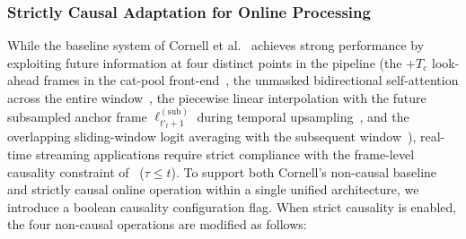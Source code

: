 \documentclass[lettersize,journal]{IEEEtran}
\begin{document}
\subsubsection{Strictly Causal Adaptation for Online Processing}
\label{sec:strictly_causal_adaptation}
While the baseline system of Cornell et al.~\cite{cornell2022overlapped} achieves strong performance by exploiting future information at four distinct points in the pipeline (the $+T_{\mathrm{c}}$ look-ahead frames in the cat-pool front-end~, the unmasked bidirectional self-attention across the entire window~, the piecewise linear interpolation with the future subsampled anchor frame $\bm{\ell}_{t'_t+1}^{(\mathrm{sub})}$ during temporal upsampling~, and the overlapping sliding-window logit averaging with the subsequent window~), real-time streaming applications require strict compliance with the frame-level causality constraint of~ ($\tau \le t$). To support both Cornell's non-causal baseline and strictly causal online operation within a single unified architecture, we introduce a boolean causality configuration flag. When strict causality is enabled, the four non-causal operations are modified as follows:
\end{document}
